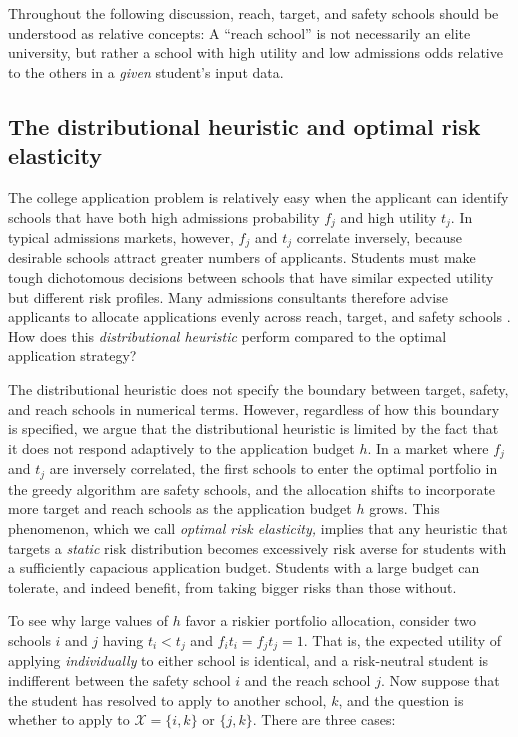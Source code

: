 Throughout the following discussion, reach, target, and safety schools should be understood as relative concepts: A ``reach school'' is not necessarily an elite university, but rather a school with high utility and low admissions odds relative to the others in a \emph{given} student's input data.


\subsection{The distributional heuristic and optimal risk elasticity}

The college application problem is relatively easy when the applicant can identify schools that have both high admissions probability $f_j$ and high utility $t_j$. In typical admissions markets, however, $f_j$ and $t_j$ correlate inversely, because desirable schools attract greater numbers of applicants. Students must make tough dichotomous decisions between schools that have similar expected utility but different risk profiles. Many admissions consultants therefore advise applicants to allocate applications evenly across reach, target, and safety schools \citep{jeon2015,peck2021}. How does this \emph{distributional heuristic} perform compared to the optimal application strategy?

The distributional heuristic does not specify the boundary between target, safety, and reach schools in numerical terms. However, regardless of how this boundary is specified, we argue that the distributional heuristic is limited by the fact that it does not respond adaptively to the application budget $h$. In a market where $f_j$ and $t_j$ are inversely correlated, the first schools to enter the optimal portfolio in the greedy algorithm are safety schools, and the allocation shifts to incorporate more target and reach schools as the application budget $h$ grows. This phenomenon, which we call \emph{optimal risk elasticity,} implies that any heuristic that targets a \emph{static} risk distribution becomes excessively risk averse for students with a sufficiently capacious application budget. Students with a large budget can tolerate, and indeed benefit, from taking bigger risks than those without.

To see why large values of $h$ favor a riskier portfolio allocation, consider two schools $i$ and $j$ having $t_i < t_j$ and $f_i t_i = f_j t_j = 1$. That is, the expected utility of applying \emph{individually} to either school is identical, and a risk-neutral student is indifferent between the safety school $i$ and the reach school $j$. Now suppose that the student has resolved to apply to another school, $k$, and the question is whether to apply to  $\mathcal{X} = \{i, k\}$ or $\{j, k\}$. There are three cases:


